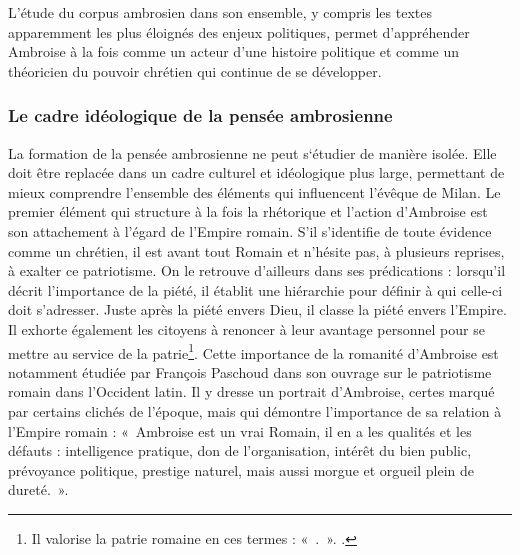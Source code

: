 \bigskip

L’étude du corpus ambrosien dans son ensemble, y compris les textes apparemment les plus éloignés des enjeux politiques, permet d’appréhender Ambroise à la fois comme un acteur d’une histoire politique et comme un théoricien du pouvoir chrétien qui continue de se développer.

\bigskip

\subsubsection*{Le cadre idéologique de la pensée ambrosienne}

La formation de la pensée ambrosienne ne peut s‘étudier de manière isolée. Elle doit être replacée dans un cadre culturel et idéologique plus large, permettant de mieux comprendre l'ensemble des éléments qui influencent l'évêque de Milan. Le premier élément qui structure à la fois la rhétorique et l'action d'Ambroise est son attachement à l'égard de l'Empire romain. S'il s'identifie de toute évidence comme un chrétien, il est avant tout Romain et n'hésite pas, à plusieurs reprises, à exalter ce patriotisme. On le retrouve d'ailleurs dans ses prédications : lorsqu'il décrit l'importance de la piété, il établit une hiérarchie pour définir à qui celle-ci doit s'adresser. Juste après la piété envers Dieu, il classe la piété envers l'Empire\autocite[\nopp I, 127]{ambroise_devoirs_1}. Il exhorte également les citoyens à renoncer à leur avantage personnel pour se mettre au service de la patrie\footnote{Il valorise la patrie romaine en ces termes : «~.~». \cite[\nopp III, 23]{ambroise_devoirs_2}.}. Cette importance de la romanité d'Ambroise est notamment étudiée par François Paschoud dans son ouvrage sur le patriotisme romain dans l'Occident latin. Il y dresse un portrait d'Ambroise, certes marqué par certains clichés de l'époque, mais qui démontre l'importance de sa relation à l'Empire romain : «~Ambroise est un vrai Romain, il en a les qualités et les défauts : intelligence pratique, don de l’organisation, intérêt du bien public, prévoyance politique, prestige naturel, mais aussi morgue et orgueil plein de dureté.~»\autocite[188-208]{paschoud_roma}.

\bigskip

